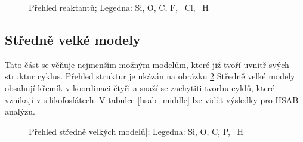\documentclass[
  digital, %
  table,   %
  lof,     %
  lot,     %
  oneside,
]{fithesis3}
\begin{document}
\begin{figure}
\caption{Přehled reaktantů; Legedna:  Si,  O,  C,  F, ~Cl, ~H}
\label{prehled_male_modely}
\end{figure}


\subsection{Středně velké modely}
Tato část se věňuje nejmenším možným modelům, které již tvoří uvnitř svých struktur cyklus. Přehled struktur je ukázán na obrázku \ref{prehled_middle} Středně velké modely obsahují křemík v koordinaci čtyři a snaží se zachytiti tvorbu cyklů, které vznikají v silikofosfátech. V tabulce \ref{hsab_middle} lze vidět výsledky pro HSAB analýzu.
\begin{figure}
\begin{center}
\caption{Přehled středně velkých modelů];  Legedna:  Si,  O,  C,  P, ~H}
\label{prehled_middle}
\end{center}
\end{figure}
\end{document}
